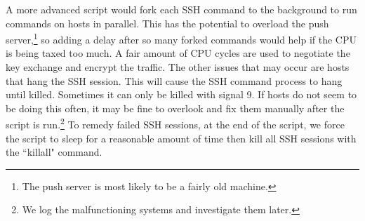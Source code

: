 A more advanced script would fork each SSH command to the background to run commands on hosts in parallel.  This has the potential to overload the push server,\footnote{The push server is most likely to be a fairly old machine.} so adding a delay after so many forked commands would help if the CPU is being taxed too much.  A fair amount of CPU cycles are used to negotiate the key exchange and encrypt the traffic.  The other issues that may occur are hosts that hang the SSH session.  This will cause the SSH command process to hang until killed.  Sometimes it can only be killed with signal 9.  If hosts do not seem to be doing this often, it may be fine to overlook and fix them manually after the script is run.\footnote{We log the malfunctioning systems and investigate them later.}  To remedy failed SSH sessions, at the end of the script, we force the script to sleep for a reasonable amount of time then kill all SSH sessions with the ``killall" command.  

